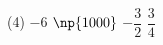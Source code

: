 %
%
    \begin{tasks}(4)
        \task $-6$
        \task $\np{1000}$
        \task $-\dfrac{3}{2}$
        \task $\dfrac{3}{4}$
    \end{tasks}
